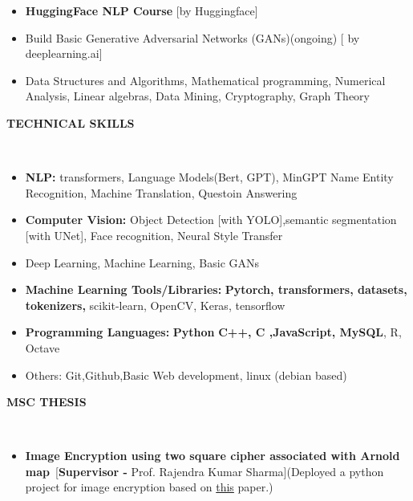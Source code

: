 \documentclass[a4paper,10pt]{article}
\newcommand{\lsep}{-0.5cm}
\newcommand{\resheading}[1]{{\small \colorbox{mygrey}{\begin{minipage}{0.975\textwidth}{\textbf{#1 \vphantom{p\^{E}}}}\end{minipage}}}}
\begin{document}
\begin{itemize}
\item \textbf{HuggingFace NLP Course} [by Huggingface]

\item Build Basic Generative Adversarial Networks (GANs)(ongoing) [ by deeplearning.ai]



\item Data Structures and Algorithms, Mathematical programming, Numerical Analysis, Linear algebras, Data Mining, Cryptography, Graph Theory
\end{itemize}

\resheading{\textbf{TECHNICAL SKILLS} }\\[\lsep]
\begin{itemize}
\setlength\itemsep{0em}

\item \textbf{NLP:} transformers, Language Models(Bert, GPT), MinGPT Name Entity Recognition, Machine Translation, Questoin Answering 

\item \textbf{Computer Vision:} Object Detection [with YOLO],semantic segmentation [with UNet], Face recognition, Neural Style Transfer

\item Deep Learning, Machine Learning, Basic GANs

\item \textbf{Machine Learning Tools/Libraries: } \textbf{Pytorch, transformers, datasets, tokenizers,} scikit-learn, OpenCV, Keras, tensorflow


\item \textbf{Programming Languages: } \textbf{Python}
\textbf{C++, C ,JavaScript, MySQL}, R, Octave

\item Others: Git,Github,Basic Web development, linux (debian based)
\end{itemize}

\resheading{\textbf{MSC THESIS} }\\[\lsep]
\begin{itemize}
\setlength\itemsep{0.5em}
\item \textbf{Image Encryption using two square cipher associated with Arnold map}\ [\textbf{Supervisor - }Prof. Rajendra Kumar Sharma](Deployed a python project for image encryption based on \href{https://web.iitd.ac.in/~rksharma/Research%20Publications/Journal/dc-optic.pdf}{this} paper.)
\end{itemize}
\end{document}
